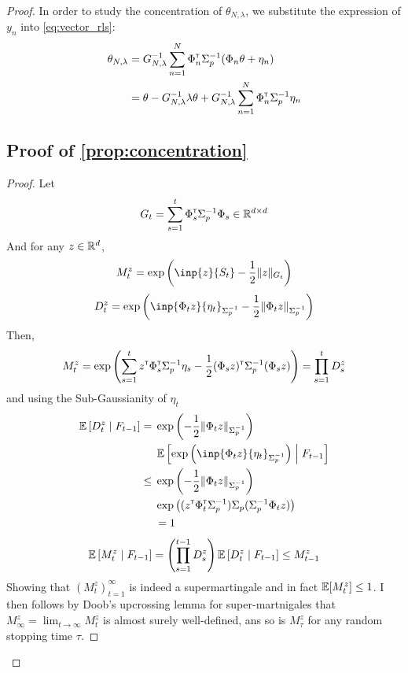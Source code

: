 \documentclass{article}
\begin{document}
\begin{proof}
In order to study the concentration of $\theta_{N,\lambda}$, we substitute the expression of $y_n$ into \eqref{eq:vector_rls}:
\begin{align*}
    \theta_{N,\lambda} &= G_{N, \lambda}^{-1} \sum_{n=1}^N \Phi_n^{\mathsf{\scriptscriptstyle T}} \Sigma_p^{-1} (\Phi_n\theta +\eta_n)\\
    &= \theta - G_{N, \lambda}^{-1}\lambda\theta + G_{N, \lambda}^{-1}\sum_{n=1}^N \Phi_n^{\mathsf{\scriptscriptstyle T}} \Sigma_p^{-1}\eta_n
\end{align*}

\subsection{Proof of \autoref{prop:concentration}}

\begin{proof}


Let 
\begin{equation*}
    G_t = \sum_{s=1}^t \Phi_s^{\mathsf{\scriptscriptstyle T}} \Sigma_p^{-1} \Phi_s \in \mathbb{R}^{d\times d}
\end{equation*}
And for any $z\in\mathbb{R}^d$,
\begin{equation*}
    M_t^z = \exp{\left(\inp{z}{S_t} - \frac{1}{2}\|z\|_{G_t}\right)}
\end{equation*}
\begin{equation*}
    D_t^z = \exp{\left(\inp{\Phi_t z}{\eta_t}_{\Sigma_p^{-1}} - \frac{1}{2}\|\Phi_t z\|_{\Sigma_p^{-1}}\right)}
\end{equation*}
Then,
\begin{align*}
    M_t^z = \exp{\left(\sum_{s=1}^t z^{\mathsf{\scriptscriptstyle T}}\Phi_s^{\mathsf{\scriptscriptstyle T}}\Sigma_p^{-1} \eta_s - \frac{1}{2} (\Phi_s z)^{\mathsf{\scriptscriptstyle T}}\Sigma_p^{-1}(\Phi_s z) \right)} = \prod_{s=1}^{t} D_s^z
\end{align*}
and using the Sub-Gaussianity of $\eta_t$
\begin{align*}
    \expectedvalue\left[D_t^z \condbar F_{t-1}\right] = {}& \exp{\left(- \frac{1}{2}\|\Phi_t z\|_{\Sigma_p^{-1}}\right)}\\ &\expectedvalue\left[\exp{\left(\inp{\Phi_t z}{\eta_t}_{\Sigma_p^{-1}}\right)} \condbar F_{t-1}\right]  \\
    \leq {} & \exp{\left(- \frac{1}{2}\|\Phi_t z\|_{\Sigma_p^{-1}}\right)}\\
    &\exp{\left((z^\transp \Phi_t^\transp \Sigma_p^{-1})\Sigma_p(\Sigma_p^{-1} \Phi_t z)\right)}\\
    &= 1
\end{align*}
\begin{align*}
    \operatorname*{\mathbb{E}}\left[M_t^z \;\middle|\; F_{t-1}\right] = \left(\prod_{s=1}^{t-1} D_s^z\right) \operatorname*{\mathbb{E}}\left[D_t^z \;\middle|\; F_{t-1}\right] \leq M_{t-1}^z
\end{align*}
Showing that $(M_t^z)_{t=1}^\infty$ is indeed a supermartingale and in fact $\operatorname*{\mathbb{E}}[M_t^z]\leq 1$.
I then follows by Doob's upcrossing lemma for super-martnigales that $M_\infty^z = \lim_{t\to\infty} M_t^z$ is almost surely well-defined, ans so is $M_\tau^z$ for any random stopping time $\tau$.


\end{proof}
\end{proof}
\end{document}
